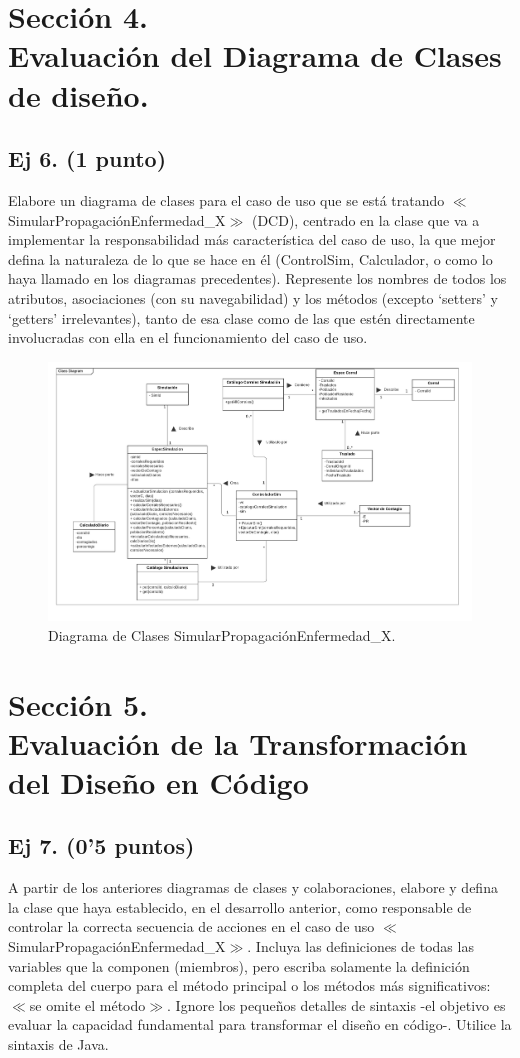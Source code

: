 \documentclass[a4paper]{article}
\begin{document}
\section{Sección 4.\\Evaluación del Diagrama de Clases de diseño.}
\subsection{Ej 6. (1 punto)}
Elabore un diagrama de clases para el caso de uso que se está tratando  $\ll$SimularPropagaciónEnfermedad\_X$\gg$  (DCD), centrado en la clase que va a implementar la responsabilidad más característica del caso de uso, la que mejor defina la naturaleza de lo que se hace en él (ControlSim, Calculador, o como lo haya llamado en los diagramas precedentes). Represente los nombres de todos los atributos, asociaciones (con su navegabilidad) y los métodos (excepto ‘setters’ y ‘getters’ irrelevantes), tanto de esa clase como de las que estén directamente involucradas con ella en el funcionamiento del caso de uso.

\begin{figure}[H]
	\centering
	\includegraphics[width=1\linewidth]{graphics/6-DC.pdf}
	\caption{Diagrama de Clases SimularPropagaciónEnfermedad\_X.}
\end{figure}


\section{Sección 5.\\Evaluación de la Transformación del Diseño en Código}
\subsection{Ej 7. (0’5 puntos)}
A partir de los anteriores diagramas de clases y colaboraciones, elabore y defina la clase que haya establecido, en el desarrollo anterior, como responsable de controlar la correcta secuencia de acciones en  el caso de uso $\ll$SimularPropagaciónEnfermedad\_X$\gg$. Incluya las definiciones de todas las variables que la componen (miembros), pero escriba solamente la definición completa del cuerpo para el método principal o los métodos más significativos: $\ll$se omite el método$\gg$. Ignore los pequeños detalles de sintaxis -el objetivo es evaluar la capacidad fundamental para transformar el diseño en código-. Utilice la sintaxis de Java.
\end{document}

